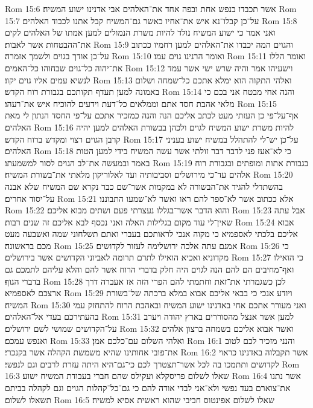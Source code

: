 Rom 15:6  אשר תכבדו בנפש אחת ובפה אחד את־האלהים אבי אדנינו ישוע המשיח׃
Rom 15:7  על־כן קבלו־נא איש את־אחיו כאשר גם־המשיח קבל אתנו לכבוד האלהים׃
Rom 15:8  ואני אמר כי ישוע המשיח נולד להיות משרת הנמולים למען אמתו של האלהים לקים את־ההבטחות אשר לאבות׃
Rom 15:9  והגוים המה יכבדו את־האלהים למען רחמיו ככתוב על־כן אודך בגוים ולשמך אזמרה׃
Rom 15:10  ואומר הרנינו גוים עמו׃
Rom 15:11  ואומר הללו את־יהוה כל־גוים שבחוהו כל־האמים׃
Rom 15:12  וישעיהו אמר והיה שרש ישי אשר עמד לנשיא עמים אליו גוים יקוו׃
Rom 15:13  ואלהי התקוה הוא ימלא אתכם כל־שמחה ושלום באמונה למען תעדף תקותכם בגבורת רוח הקדש׃
Rom 15:14  והנה אחי מבטח אני בכם כי מלאי אהבת חסד אתם וממלאים כל־דעת וידעים להוכיח איש את־רעהו׃
Rom 15:15  אף־על־פי כן העזתי מעט לכתב אליכם הנה והנה כמזכיר אתכם על־פי החסד הנתון לי מאת האלהים׃
Rom 15:16  להיות משרת ישוע המשיח לגוים ולכהן בבשורת האלהים למען יהיה קרבן הגוים רצוי ומקדש ברוח הקדש׃
Rom 15:17  על־כן יש־לי להתהלל במשיח ישוע בעניני האלהים׃
Rom 15:18  כי לא־אעז פני לדבר דבר זולתי אשר עשה המשיח בידי למען הטות באמר ובמעשה את־לב הגוים לסור למשמעתו׃
Rom 15:19  בגבורת אתות ומופתים ובגבורת רוח אלהים עד־כי מירושלים וסביבותיה ועד לאלוריקון מלאתי את־בשורת המשיח׃
Rom 15:20  בהשתדלי להגיד את־הבשורה לא במקמות אשר־שם כבר נקרא שם המשיח שלא אבנה על־יסוד אחרים׃
Rom 15:21  אלא ככתוב אשר לא־ספר להם ראו ואשר לא־שמעו התבוננו׃
Rom 15:22  והוא הדבר אשר־בגללו נעצרתי פעם ושתים מבוא אליכם׃
Rom 15:23  אבל עתה שאין־לי עוד מקום בגלילות האלה ואני נכסף לבא אליכם זה שנים רבות׃
Rom 15:24  אבוא אליכם בלכתי לאספמיא כי מקוה אנכי לראותכם בעברי ואתם תשלחוני שמה ואשבעה מעט מכם בראשונה׃
Rom 15:25  אמנם עתה אלכה ירושלימה לעזור לקדושים׃
Rom 15:26  כי מקדוניא ואכיא הואילו לתרם תרומה לאביוני הקדושים אשר בירושלים׃
Rom 15:27  כי הואילו ואף־מחיבים הם להם הנה לגוים היה חלק בדברי הרוח אשר להם והלא עליהם לתמכם גם בדברי הגוף׃
Rom 15:28  לכן כשגמרתי את־זאת וחתמתי להם הפרי הזה אז אעברה דרך ארצכם לאספמיא׃
Rom 15:29  ויודע אנכי כי בבאי אליכם אבוא במלא ברכתה של־בשורת המשיח׃
Rom 15:30  ואני מעורר אתכם אחי באדנינו ישוע המשיח ובאהבת הרוח להתחזק עמי בהעתירכם בעדי אל־האלהים׃
Rom 15:31  למען אשר אנצל מהסוררים בארץ יהודה ויערב על־הקדושים שמושי לשם ירושלים׃
Rom 15:32  ואשר אבוא אליכם בשמחה ברצון אלהים ואנפש עמכם׃
Rom 15:33  ואלהי השלום עם־כלכם אמן׃
Rom 16:1  והנני מזכיר לכם לטוב את־פובי אחותינו שהיא משמשת הקהלה אשר בקנכרי׃
Rom 16:2  אשר תקבלוה באדנינו כראוי לקדושים ותתמכו בה לכל אשר־תצטרך לכם כי־גם־היא היתה עזרת לרבים וגם לנפשי׃
Rom 16:3  שאלו לשלום פריסקלא ועקילס שהם חברי בעבודת המשיח ישוע׃
Rom 16:4  אשר נתנו את־צוארם בעד נפשי ולא־אני לבדי אודה להם כי גם־כל־קהלות הגוים וגם לקהלה בביתם תשאלו לשלום׃
Rom 16:5  שאלו לשלום אפינטוס חביבי שהוא ראשית אסיא למשיח׃
